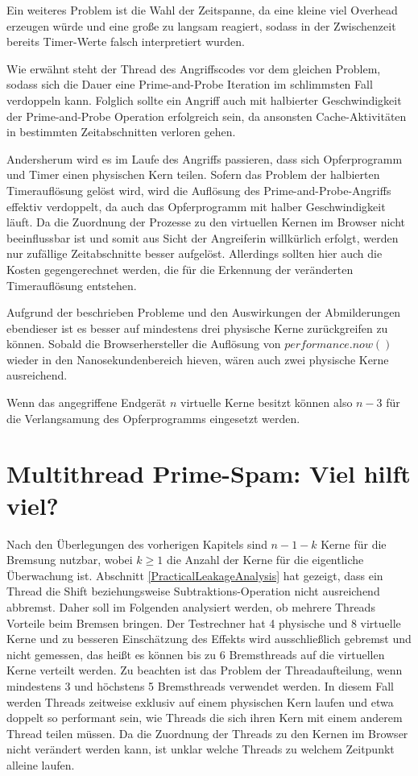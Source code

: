 Ein weiteres Problem ist die Wahl der Zeitspanne, da eine kleine viel Overhead erzeugen würde und eine große zu langsam reagiert, sodass in der Zwischenzeit bereits Timer-Werte falsch interpretiert wurden.

Wie erwähnt steht der Thread des Angriffscodes vor dem gleichen Problem, sodass sich die Dauer eine Prime-and-Probe Iteration im schlimmsten Fall verdoppeln kann.
Folglich sollte ein Angriff auch mit halbierter Geschwindigkeit der Prime-and-Probe Operation erfolgreich sein, da ansonsten Cache-Aktivitäten in bestimmten Zeitabschnitten verloren gehen.

Andersherum wird es im Laufe des Angriffs passieren, dass sich Opferprogramm und Timer einen physischen Kern teilen.
Sofern das Problem der halbierten Timerauflösung gelöst wird, wird die Auflösung des Prime-and-Probe-Angriffs effektiv verdoppelt, da auch das Opferprogramm mit halber Geschwindigkeit läuft.
Da die Zuordnung der Prozesse zu den virtuellen Kernen im Browser nicht beeinflussbar ist und somit aus Sicht der Angreiferin willkürlich erfolgt, werden nur zufällige Zeitabschnitte besser aufgelöst.
Allerdings sollten hier auch die Kosten gegengerechnet werden, die für die Erkennung der veränderten Timerauflösung entstehen.

Aufgrund der beschrieben Probleme und den Auswirkungen der Abmilderungen ebendieser ist es besser auf mindestens drei physische Kerne zurückgreifen zu können.
Sobald die Browserhersteller die Auflösung von $performance.now()$ wieder in den Nanosekundenbereich hieven, wären auch zwei physische Kerne ausreichend. 

Wenn das angegriffene Endgerät $n$ virtuelle Kerne besitzt können also $n-3$ für die Verlangsamung des Opferprogramms eingesetzt werden.

\section{Multithread Prime-Spam: Viel hilft viel?}
\label{MoreIsBetter}

Nach den Überlegungen des vorherigen Kapitels sind $n-1-k$ Kerne für die Bremsung nutzbar, wobei $k \geq 1$ die Anzahl der Kerne für die eigentliche Überwachung ist. 
Abschnitt \ref{PracticalLeakageAnalysis} hat gezeigt, dass ein Thread die Shift beziehungsweise Subtraktions-Operation nicht ausreichend abbremst.
Daher soll im Folgenden analysiert werden, ob mehrere Threads Vorteile beim Bremsen bringen.
Der Testrechner hat 4 physische und 8 virtuelle Kerne und zu besseren Einschätzung des Effekts wird ausschließlich gebremst und nicht gemessen, das heißt es können bis zu 6 Bremsthreads auf die virtuellen Kerne verteilt werden.
Zu beachten ist das Problem der Threadaufteilung, wenn mindestens 3 und höchstens 5 Bremsthreads verwendet werden.
In diesem Fall werden Threads zeitweise exklusiv auf einem physischen Kern laufen und etwa doppelt so performant sein, wie Threads die sich ihren Kern mit einem anderem Thread teilen müssen.
Da die Zuordnung der Threads zu den Kernen im Browser nicht verändert werden kann, ist unklar welche Threads zu welchem Zeitpunkt alleine laufen.

